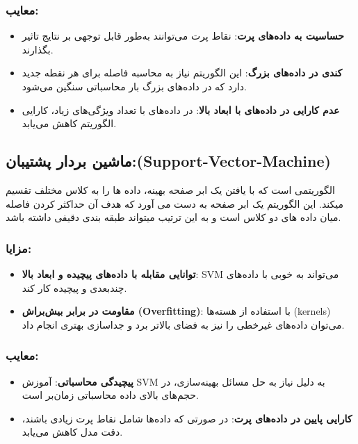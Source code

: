 \subsubsection{معایب:}

\begin{itemize}
	\item \textbf{حساسیت به داده‌های پرت}: نقاط پرت می‌توانند به‌طور قابل توجهی بر نتایج تاثیر بگذارند.
	\item \textbf{کندی در داده‌های بزرگ}: این الگوریتم نیاز به محاسبه فاصله برای هر نقطه جدید دارد که در داده‌های بزرگ بار محاسباتی سنگین می‌شود.
	\item \textbf{عدم کارایی در داده‌های با ابعاد بالا}: در داده‌های با تعداد ویژگی‌های زیاد، کارایی الگوریتم کاهش می‌یابد.
\end{itemize}


\subsection{ماشین بردار پشتیبان:(Support-Vector-Machine)}
الگوریتمی است که با یافتن یک ابر صفحه بهینه، داده ها را به کلاس مختلف تقسیم میکند.
این  الگوریتم یک ابر صفحه به دست می آورد که هدف آن  حداکثر کردن فاصله میان داده های دو کلاس است و به این ترتیب میتواند طبقه بندی دقیفی داشته باشد.

\subsubsection{مزایا:}
\begin{itemize}
	
	    \item \textbf{توانایی مقابله با داده‌های پیچیده و ابعاد بالا}: SVM می‌تواند به خوبی با داده‌های چندبعدی و پیچیده کار کند.
	\item \textbf{مقاومت در برابر بیش‌براش (Overfitting)}: با استفاده از هسته‌ها (kernels) می‌توان داده‌های غیرخطی را نیز به فضای بالاتر برد و جداسازی بهتری انجام داد.
	
\end{itemize}

\subsubsection{معایب:}
\begin{itemize}
	\item \textbf{پیچیدگی محاسباتی}: آموزش SVM به دلیل نیاز به حل مسائل بهینه‌سازی، در حجم‌های بالای داده محاسباتی زمان‌بر است.
	\item \textbf{کارایی پایین در داده‌های پرت}: در صورتی که داده‌ها شامل نقاط پرت زیادی باشند، دقت مدل کاهش می‌یابد.
\end{itemize}

